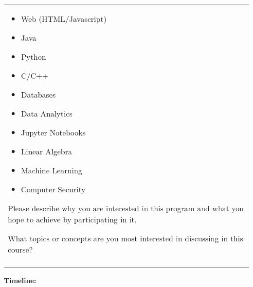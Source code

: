 \documentclass[12pt]{article}
\renewcommand{\_}{\kern-1.5pt\textunderscore\kern-1.5pt}
\begin{document}
\begin{table}[H]
\begin{tabular}{p{6.3in}}
{\begin{itemize}
	\item Web (HTML/Javascript) \par 	\item Java \par 	\item Python  \par 	\item C/C++ \par 	\item Databases  \par 	\item Data Analytics \par 	\item Jupyter Notebooks \par 	\item Linear Algebra \par 	\item Machine Learning  \par 	\item Computer Security 
\end{itemize} \par Please describe why you are interested in this program and what you hope to achieve by participating in it. \par What topics or concepts are you most interested in discussing in this course?  \par } \\
\hhline{-}

\end{tabular}
 \end{table}



\textbf{Timeline: }\par
\end{document}
